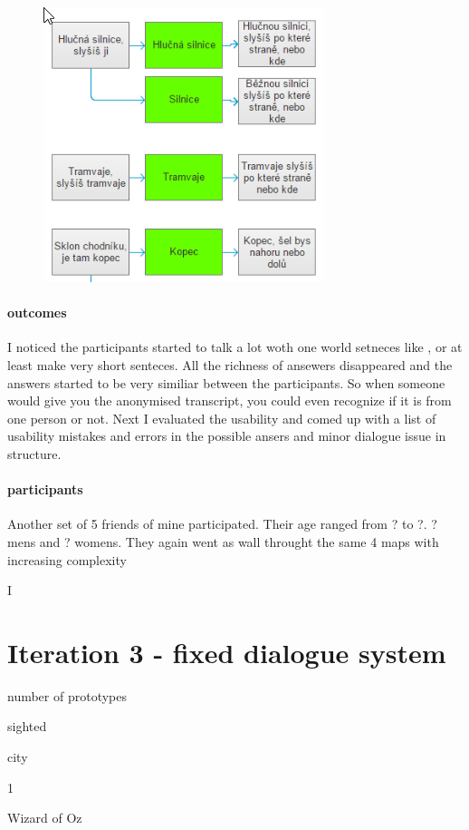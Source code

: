\begin{figure}[h]
	\centering
	\includegraphics[width=0.7\linewidth]{figures/2ndExp-human2WoZOverMap/detail}
	\caption[Detail]{}
	\caption{}
	\label{fig:detail}
\end{figure}

\paragraph{outcomes}
I noticed the participants started to talk a lot woth one world setneces like ,  or at least make very short senteces. All the richness of ansewers disappeared and the answers started to be very similiar between the participants. So when someone would give you the anonymised transcript, you could even recognize if it is from one person or not.
Next I evaluated the usability and comed up with a list of usability mistakes and errors in the possible ansers and minor dialogue issue in structure.

\paragraph{participants}
Another set of 5 friends of mine participated. Their age ranged from ? to ?. ? mens and ? womens. They again went as wall throught the same 4 maps with increasing complexity

	
	 I 
	\section{Iteration 3 - fixed dialogue system}
	\begin{labeling}{number of prototypes}
		\item [people] sighted
		\item [environment] city
		\item [number of prototypes] 1
		\item [implementation] Wizard of Oz
	\end{labeling}
